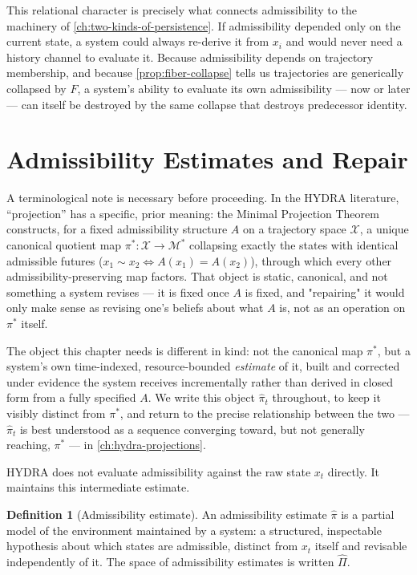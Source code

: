\documentclass[11pt]{book}
\theoremstyle{plain}
\theoremstyle{definition}
\newtheorem{definition}[theorem]{Definition}
\theoremstyle{remark}
\begin{document}
This relational character is precisely what connects admissibility to
the machinery of \cref{ch:two-kinds-of-persistence}. If admissibility
depended only on the current state, a system could always re-derive it
from $x_i$ and would never need a history channel to evaluate it. Because
admissibility depends on trajectory membership, and because
\cref{prop:fiber-collapse} tells us trajectories are generically
collapsed by $F$, a system's ability to evaluate its own admissibility
--- now or later --- can itself be destroyed by the same collapse that
destroys predecessor identity.

\section{Admissibility Estimates and Repair}
\label{sec:estimates-and-repair}

A terminological note is necessary before proceeding. In the HYDRA
literature, \enquote{projection} has a specific, prior meaning: the
Minimal Projection Theorem constructs, for a fixed admissibility
structure $A$ on a trajectory space $\mathcal{X}$, a unique canonical
quotient map $\pi^* : \mathcal{X} \to \mathcal{M}^*$ collapsing exactly
the states with identical admissible futures ($x_1 \sim x_2 \iff
A(x_1) = A(x_2)$), through which every other admissibility-preserving
map factors. That object is static, canonical, and not something a
system revises --- it is fixed once $A$ is fixed, and "repairing" it
would only make sense as revising one's beliefs about what $A$ is, not
as an operation on $\pi^*$ itself.

The object this chapter needs is different in kind: not the canonical
map $\pi^*$, but a system's own time-indexed, resource-bounded
\emph{estimate} of it, built and corrected under evidence the system
receives incrementally rather than derived in closed form from a
fully specified $A$. We write this object $\hat\pi_t$ throughout, to
keep it visibly distinct from $\pi^*$, and return to the precise
relationship between the two --- $\hat\pi_t$ is best understood as a
sequence converging toward, but not generally reaching,
$\pi^*$ --- in \cref{ch:hydra-projections}.

HYDRA does not evaluate admissibility against the raw state $x_t$
directly. It maintains this intermediate estimate.

\begin{definition}[Admissibility estimate]
\label{def:projection}
An admissibility estimate $\hat\pi$ is a partial model of the
environment maintained by a system: a structured, inspectable
hypothesis about which states are admissible, distinct from $x_t$
itself and revisable independently of it. The space of admissibility
estimates is written $\hat\Pi$.
\end{definition}
\end{document}
